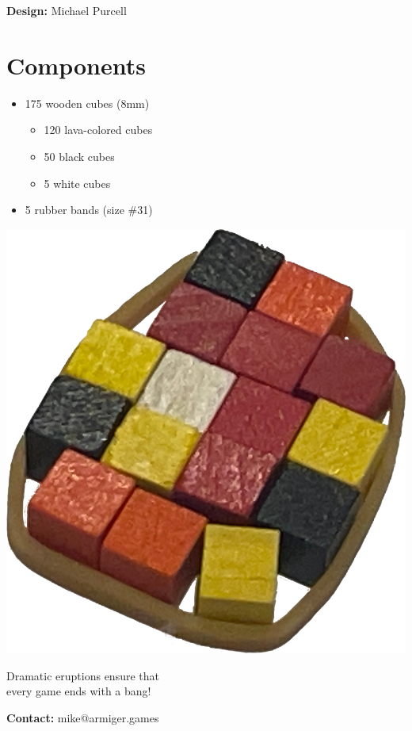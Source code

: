 \documentclass[a5paper, DIV=18, 12pt]{scrartcl}
\begin{document}
\begin{multicols}{2}
\vspace{3.0ex}

\textbf{Design:} Michael Purcell


\section*{\textcolor{eruption_purple}{Components}}
\begin{itemize}[leftmargin=*, nosep]
	\item 175 wooden cubes (8mm)
	\begin{itemize}[leftmargin=*, nosep]
	\vspace{0.9ex}
	  \item 120 lava-colored cubes
	  \vspace{0.9ex}
	  \item 50 black cubes
	  \vspace{0.9ex}
	  \item 5 white cubes
	\end{itemize}
	\vspace{0.9ex}
	\item 5 rubber bands (size \#31)
\end{itemize}

\vspace{6ex}

\qquad \includegraphics[width=0.55\columnwidth]{Images/eruption1.png}

\vspace{2ex}
Dramatic eruptions ensure that\\every game ends with a bang!  

\vfill{}

\textbf{Contact:} mike@armiger.games
\end{multicols}
\end{document}
